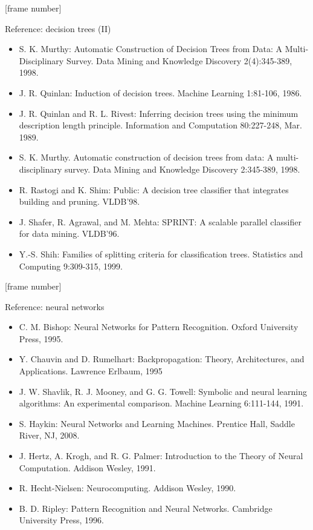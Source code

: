 \documentclass[aspectratio=169,t,table]{beamer}
\begin{document}
  {
    [frame number]
    \begin{frame}{Reference: decision trees (II)}
      \begin{itemize}
        \item S. K. Murthy: Automatic Construction of Decision Trees from Data: A Multi-Disciplinary Survey. Data Mining and Knowledge Discovery 2(4):345-389, 1998.
        \item J. R. Quinlan: Induction of decision trees. Machine Learning 1:81-106, 1986.
        \item J. R. Quinlan and R. L. Rivest: Inferring decision trees using the minimum description length principle. Information and Computation 80:227-248, Mar. 1989.
        \item S. K. Murthy. Automatic construction of decision trees from data: A multi-disciplinary survey. Data Mining and Knowledge Discovery 2:345-389, 1998.
        \item R. Rastogi and K. Shim: Public: A decision tree classifier that integrates building and pruning. VLDB'98.
        \item J. Shafer, R. Agrawal, and M. Mehta: SPRINT: A scalable parallel classifier for data mining. VLDB'96.
        \item Y.-S. Shih: Families of splitting criteria for classification trees. Statistics and Computing 9:309-315, 1999.
      \end{itemize}
    \end{frame}
  }

  {
    [frame number]
    \begin{frame}{Reference: neural networks}
      \begin{itemize}
        \item C. M. Bishop: Neural Networks for Pattern Recognition. Oxford University Press, 1995.
        \item Y. Chauvin and D. Rumelhart: Backpropagation: Theory, Architectures, and Applications. Lawrence Erlbaum, 1995
        \item J. W. Shavlik, R. J. Mooney, and G. G. Towell: Symbolic and neural learning algorithms: An experimental comparison. Machine Learning 6:111-144, 1991.
        \item S. Haykin: Neural Networks and Learning Machines. Prentice Hall, Saddle River, NJ, 2008.
        \item J. Hertz, A. Krogh, and R. G. Palmer: Introduction to the Theory of Neural Computation. Addison Wesley, 1991.
        \item R. Hecht-Nielsen: Neurocomputing. Addison Wesley, 1990.
        \item B. D. Ripley: Pattern Recognition and Neural Networks. Cambridge University Press, 1996.
      \end{itemize}
    \end{frame}
  }
\end{document}
